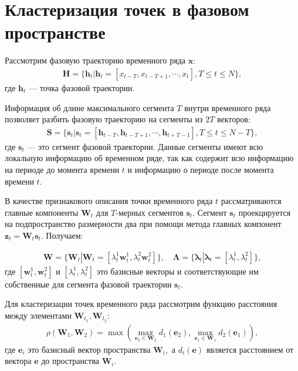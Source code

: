 \section{Кластеризация точек в фазовом пространстве}
Рассмотрим фазовую траекторию временного ряда $\textbf{x}$:
\[
\label{eq:cl:1}
\begin{aligned}
\mathbf{H} = \{\textbf{h}_t| \textbf{h}_t = [x_{t-T}, x_{t-T+1}, \cdots, x_{t}], T\leq t\leq N\},
\end{aligned}
\]
где $\textbf{h}_t$ --- точка фазовой траектории.

Информация об длине максимального сегмента $T$ внутри временного ряда позволяет разбить фазовую траекторию на сегменты из $2T$ векторов:
\[
\label{eq:cl:2}
\begin{aligned}
\mathbf{S} = \{\textbf{s}_t| \textbf{s}_t = [\textbf{h}_{t-T}, \textbf{h}_{t-T+1}, \cdots, \textbf{h}_{t+T-1}], T\leq t\leq N-T\},
\end{aligned}
\]
где $\textbf{s}_t$ --- это сегмент фазовой траектории. Данные сегменты имеют всю локальную информацию об временном ряде, так как содержит всю информацию на периоде до момента времени $t$ и информацию о периоде после момента времени $t$.

В качестве признакового описания точки временного ряда $t$ рассматриваются главные компоненты $\textbf{W}_t$ для $T\text{-мерных}$ сегментов $\textbf{s}_t$. Сегмент $\textbf{s}_t$ проекцируется на подпространство размерности два при помощи метода главных  компонент $\textbf{z}_t = \textbf{W}_t\textbf{s}_t$. Получаем:

\[
\label{eq:cl:3}
\begin{aligned}
\mathbf{W} = \{\textbf{W}_t| \textbf{W}_t = [\lambda^1_t\textbf{w}^1_t, \lambda^2_t\textbf{w}^2_t]\}, \quad \bm{\Lambda} = \{\bm{\lambda}_t| \bm{\lambda}_t=[\lambda^1_t, \lambda^2_t]\},
\end{aligned}
\]
где $[\textbf{w}^1_t, \textbf{w}^2_t]$ и $[\lambda^1_t, \lambda^2_t]$ это базисные векторы и соответствующие им собственные для сегмента фазовой траектории $\textbf{s}_t$.

Для кластеризации точек временного ряда рассмотрим функцию расстояния между элементами $\mathbf{W}_{t_1},\mathbf{W}_{t_2}$:
\[
\label{eq:cl:4}
\begin{aligned}
\rho\left(\textbf{W}_1, \textbf{W}_2\right) = \max\left(\max_{\textbf{e}_2 \in \textbf{W}_2} d_{1}\left(\textbf{e}_2\right), \max_{\textbf{e}_1 \in \textbf{W}_1} d_{2}\left(\textbf{e}_1\right)\right),
\end{aligned}
\]
где  $\textbf{e}_i$ это базисный вектор пространства $\textbf{W}_i,$ а $d_i\left(\textbf{e}\right)$ является расстоянием от вектора $\textbf{e}$ до пространства $\textbf{W}_i$.

